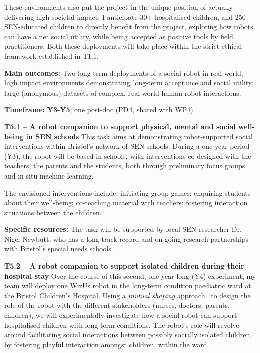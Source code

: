 \documentclass[11pt,a4paper]{report}
\newcommand{\project}{WizUs\xspace}
\begin{document}
These environments also put the project in the unique position of actually
delivering high societal impact: I anticipate 30+ hospitalised children, and 250
SEN-educated children to directly benefit from the project, exploring how robots
can have a net social utility, while being accepted as positive tools by field
practitioners. Both these deployments will take place within the strict ethical
framework established in T1.1.

\begin{framed}

    \textbf{Main outcomes:} Two long-term deployments of a social robot in
    real-world, high impact environments demonstrating long-term acceptance and
    social utility; large (anonymous) datasets of complex, real-world
    human-robot interactions.

    \textbf{Timeframe:} \textbf{Y3-Y5}; one post-doc (PD4, shared with WP4).

\end{framed}

\textbf{T5.1 -- A robot companion to support physical, mental and social
well-being in SEN schools} This task aims at demonstrating robot-supported
social interventions within Bristol's network of SEN schools.  During a one-year
period (Y3), the robot will be based in schools, with interventions co-designed
with the teachers, the parents and the students, both through preliminary
focus groups and in-situ machine learning.

The envisioned interventions include: initiating group games; enquiring students
about their well-being; co-teaching material with teachers; fostering
interaction situations between the children.

\textbf{Specific resources:} The task will be supported by local SEN researcher
Dr. Nigel Newbutt, who has a long track record and on-going research
partnerships with Bristol's special needs schools.


\textbf{T5.2 -- A robot companion to support isolated children during their
hospital stay} Over the course of this second, one-year long (Y4)
experiment, my team will deploy one \project robot in the long-term condition
paediatric ward at the Bristol Children's Hospital.  Using a \emph{mutual shaping}
approach~\cite{winkle2018social} to design the role of the robot with the
different stakeholders (nurses, doctors, parents, children), we will
experimentally investigate how a social robot can support hospitalised children
with long-term conditions. The robot's role will revolve around facilitating
social interactions between possibly socially isolated children, by fostering
playful interaction amongst children, within the ward.
\end{document}
